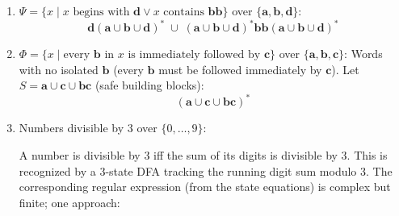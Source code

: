 \begin{enumerate}[{6.}1.]
\begin{enumerate}[(a)]
  \item $L_3=\{z\mid|z|_{\pmb{a}}\text{ even}\}$:
  \[
    (\pmb{b}\cup\pmb{c})^*(\pmb{a}\pmb{a}(\pmb{b}\cup\pmb{c})^*\cup\epsilon)^*
    \;=\;
    ((\pmb{b}\cup\pmb{c})^*\pmb{a}(\pmb{b}\cup\pmb{c})^*\pmb{a})^*(\pmb{b}\cup\pmb{c})^*
  \]

  \item $L_4=\{z\mid|z|_{\pmb{c}}\text{ prime}\}$: Not regular.  The set of primes is not eventually periodic, so the language $\{c^p\mid p\text{ prime}\}\subseteq L_4$ restricted to $\Sigma=\{\pmb{c}\}$ is not FAD (pumping lemma).  Hence $L_4$ has no regular expression.

  \item $L_5=\{x\mid\pmb{abc}\text{ is a substring}\}$:
  \[
    (\pmb{a}\cup\pmb{b}\cup\pmb{c})^*\pmb{abc}(\pmb{a}\cup\pmb{b}\cup\pmb{c})^*
  \]

  \item $L_6=\{x\mid\pmb{acaba}\text{ is a substring}\}$:
  \[
    (\pmb{a}\cup\pmb{b}\cup\pmb{c})^*\pmb{acaba}(\pmb{a}\cup\pmb{b}\cup\pmb{c})^*
  \]

  \item $L_7=\{x\mid|x|_{\pmb{a}}\equiv 0\pmod{3}\}$:
  \[
    (\pmb{b}\cup\pmb{c})^*(\pmb{a}(\pmb{b}\cup\pmb{c})^*\pmb{a}(\pmb{b}\cup\pmb{c})^*\pmb{a}(\pmb{b}\cup\pmb{c})^*)^*
  \]
\end{enumerate}

\item $\Psi=\{x\mid x\text{ begins with }\pmb{d}\vee x\text{ contains }\pmb{bb}\}$ over $\{\pmb{a},\pmb{b},\pmb{d}\}$:
\[
  \pmb{d}(\pmb{a}\cup\pmb{b}\cup\pmb{d})^*
  \;\cup\;
  (\pmb{a}\cup\pmb{b}\cup\pmb{d})^*\pmb{bb}(\pmb{a}\cup\pmb{b}\cup\pmb{d})^*
\]

\item $\Phi=\{x\mid\text{every }\pmb{b}\text{ in }x\text{ is immediately followed by }\pmb{c}\}$ over $\{\pmb{a},\pmb{b},\pmb{c}\}$:
Words with no isolated $\pmb{b}$ (every $\pmb{b}$ must be followed immediately by $\pmb{c}$).  Let $S=\pmb{a}\cup\pmb{c}\cup\pmb{bc}$ (safe building blocks):
\[
  (\pmb{a}\cup\pmb{c}\cup\pmb{bc})^*
\]

\item Numbers divisible by 3 over $\{0,\ldots,9\}$:

A number is divisible by 3 iff the sum of its digits is divisible by 3.  This is recognized by a 3-state DFA tracking the running digit sum modulo 3.  The corresponding regular expression (from the state equations) is complex but finite; one approach:


\end{enumerate}
